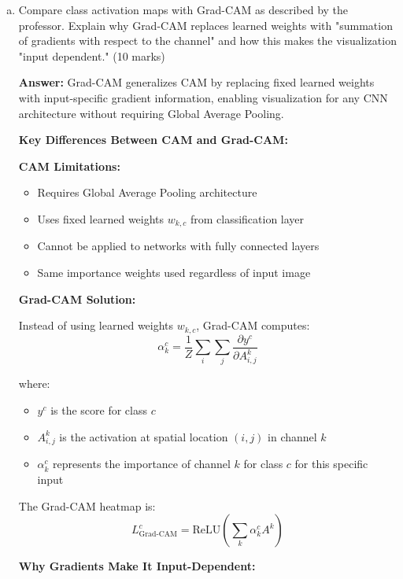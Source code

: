 \documentclass[12pt]{article}
\newcommand{\answer}[1]{{\color{answercolor}\textbf{Answer:} #1}}
\newcommand{\explanation}[1]{{\color{explanationcolor}#1}}
\begin{document}
\begin{enumerate}[(a)]
{    The key insight is that GAP forces channels to become semantic detectors, and CAM visualizes how these detectors vote for each class across the image.
    }
    
    \item Compare class activation maps with Grad-CAM as described by the professor. Explain why Grad-CAM replaces learned weights with "summation of gradients with respect to the channel" and how this makes the visualization "input dependent." \hfill (10 marks)
    
    \answer{Grad-CAM generalizes CAM by replacing fixed learned weights with input-specific gradient information, enabling visualization for any CNN architecture without requiring Global Average Pooling.}
    
    \explanation{
    \textbf{Key Differences Between CAM and Grad-CAM:}
    
    \textbf{CAM Limitations:}
    \begin{itemize}
        \item Requires Global Average Pooling architecture
        \item Uses fixed learned weights $w_{k,c}$ from classification layer
        \item Cannot be applied to networks with fully connected layers
        \item Same importance weights used regardless of input image
    \end{itemize}
    
    \textbf{Grad-CAM Solution:}
    
    Instead of using learned weights $w_{k,c}$, Grad-CAM computes:
    $$\alpha_k^c = \frac{1}{Z} \sum_i \sum_j \frac{\partial y^c}{\partial A_{i,j}^k}$$
    
    where:
    \begin{itemize}
        \item $y^c$ is the score for class $c$
        \item $A_{i,j}^k$ is the activation at spatial location $(i,j)$ in channel $k$
        \item $\alpha_k^c$ represents the importance of channel $k$ for class $c$ for this specific input
    \end{itemize}
    
    The Grad-CAM heatmap is:
    $$L_{\text{Grad-CAM}}^c = \text{ReLU}\left(\sum_k \alpha_k^c A^k\right)$$
    
    \textbf{Why Gradients Make It Input-Dependent:}
    
}
\end{enumerate}
\end{document}
